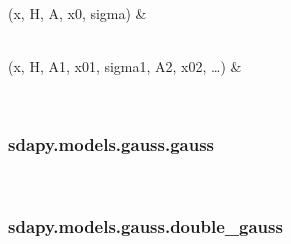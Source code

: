 \documentclass[letterpaper,10pt,english]{sphinxmanual}
\begin{document}


\begin{savenotes}\sphinxatlongtablestart\begin{longtable}[c]{}
\hline

\endfirsthead

%
{}\\
\hline

\endhead

\hline
{}\\
\endfoot

\endlastfoot

{\hyperref[\detokenize{generated/sdapy.models.gauss.gauss:sdapy.models.gauss.gauss}]{}}(x, H, A, x0, sigma)
&

\\
\hline
{\hyperref[\detokenize{generated/sdapy.models.gauss.double_gauss:sdapy.models.gauss.double_gauss}]{}}(x, H, A1, x01, sigma1, A2, x02, …)
&

\\
\hline
\end{longtable}\sphinxatlongtableend\end{savenotes}


\subsubsection{sdapy.models.gauss.gauss}
\label{\detokenize{generated/sdapy.models.gauss.gauss:sdapy-models-gauss-gauss}}\label{\detokenize{generated/sdapy.models.gauss.gauss::doc}}

\begin{fulllineitems}
\label{\detokenize{generated/sdapy.models.gauss.gauss:sdapy.models.gauss.gauss}}~
\end{fulllineitems}



\subsubsection{sdapy.models.gauss.double\_gauss}
\label{\detokenize{generated/sdapy.models.gauss.double_gauss:sdapy-models-gauss-double-gauss}}\label{\detokenize{generated/sdapy.models.gauss.double_gauss::doc}}
\end{document}
